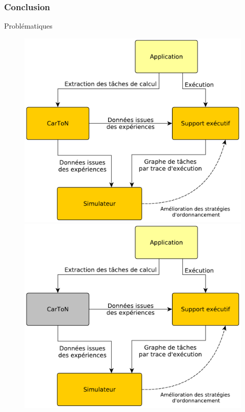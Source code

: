 \documentclass[xcolor={usenames,dvipsnames,svgnames,table}, aspectratio=43]{beamer}
\begin{document}
\begin{frame}
  \frametitle{Conclusion}

  \begin{minipage}[t]{0.36\linewidth}
    \begin{block}{Problématiques}
      \begin{itemize}
      \end{itemize}
    \end{block}
  \end{minipage}
      \hfill
  \begin{minipage}[t]{0.60\linewidth}
    \begin{figure}
       {%
	\includegraphics[width=\textwidth]{graph/big_picture.pdf}%
      }%
       {%
	\includegraphics[width=\textwidth]{graph/big_picture-synt-1.pdf}%
}
\end{figure}
\end{minipage}
\end{frame}
\end{document}
